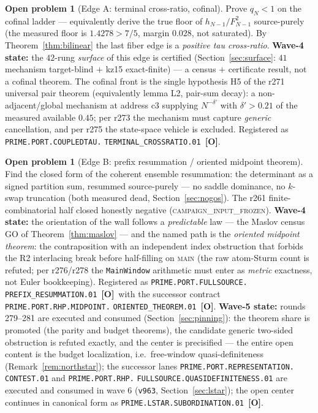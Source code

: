 \documentclass[11pt]{article}
\newcommand{\mO}{\textcolor{openred}{\textbf{[O]}}}
\theoremstyle{definition}
\newtheorem{openproblem}[theorem]{Open problem}
\theoremstyle{remark}
\begin{document}
\begin{openproblem}[Edge A: terminal cross-ratio, cofinal]
Prove $q_N<1$ on the cofinal ladder --- equivalently derive the true floor
of $h_{N-1}/F_{N-1}^2$ source-purely (the measured floor is $1.4278>7/5$,
margin $0.028$, not saturated).  By Theorem~\ref{thm:bilinear} the last
fiber edge is a \emph{positive tau cross-ratio}.  \textbf{Wave-4 state:}
the $42$-rung \emph{surface} of this edge is certified
(Section~\ref{sec:surface}: $41$ mechanism target-blind $+$ kz15
exact-finite) --- a census $+$ certificate result, not a cofinal theorem.
The cofinal front is the single hypothesis H5 of the r271 universal pair
theorem (equivalently lemma L2, pair-sum decay): a non-adjacent/global
mechanism at address c3 supplying $N^{-\delta'}$ with $\delta'>0.21$ of
the measured available $0.45$; per r273 the mechanism must capture
\emph{generic} cancellation, and per r275 the state-space vehicle is
excluded.  Registered as \texttt{PRIME.PORT.COUPLEDTAU.}\allowbreak
\texttt{TERMINAL\_CROSSRATIO.01}~\mO.
\end{openproblem}

\begin{openproblem}[Edge B: prefix resummation / oriented midpoint theorem]
Find the closed form of the coherent ensemble resummation: the determinant
as a signed partition sum, resummed source-purely --- no saddle dominance,
no $k$-swap truncation (both measured dead, Section~\ref{sec:nogos}).
The r261 finite-combinatorial half closed honestly negative
(\textsc{campaign\_input\_frozen}).  \textbf{Wave-4 state:} the
orientation of the wall follows a \emph{predictable} law --- the Maslov
census GO of Theorem~\ref{thm:maslov} --- and the named path is the
\emph{oriented midpoint theorem}: the contraposition with an independent
index obstruction that forbids the R2 interlacing break before
half-filling on \textsc{main} (the raw atom-Sturm count is refuted; per
r276/r278 the \texttt{MainWindow} arithmetic must enter as \emph{metric}
exactness, not Euler bookkeeping).  Registered as
\texttt{PRIME.PORT.FULLSOURCE.}\allowbreak
\texttt{PREFIX\_RESUMMATION.01}~\mO\ with the successor contract
\texttt{PRIME.PORT.RHP.MIDPOINT.}\allowbreak
\texttt{ORIENTED\_THEOREM.01}~\mO.  \textbf{Wave-5 state:} rounds
279--281 are executed and consumed
(Section~\ref{sec:pinning}): the theorem share is promoted (the parity
and budget theorems), the candidate generic two-sided obstruction is
refuted exactly, and the center is precisified --- the entire open
content is the budget localization, i.e.\ free-window
quasi-definiteness (Remark~\ref{rem:northstar}); the successor lanes
\texttt{PRIME.PORT.}\allowbreak\texttt{REPRESENTATION.}\allowbreak
\texttt{CONTEST.01} and \texttt{PRIME.PORT.RHP.}\allowbreak
\texttt{FULLSOURCE.}\allowbreak\texttt{QUASIDEFINITENESS.01}
are executed and consumed in wave 6 (\texttt{v963},
Section~\ref{sec:lstar}); the open center continues in canonical form
as \texttt{PRIME.LSTAR.SUBORDINATION.01}~\mO.
\end{openproblem}
\end{document}
